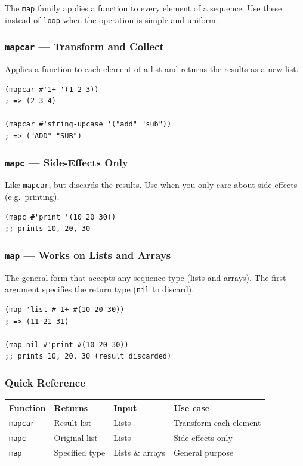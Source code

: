 The \texttt{map} family applies a function to every element of a
sequence. Use these instead of \texttt{loop} when the operation is
simple and uniform.

\subsubsection{\texttt{mapcar} --- Transform and Collect}

Applies a function to each element of a list and returns the results
as a new list.

\begin{lstlisting}
(mapcar #'1+ '(1 2 3))
; => (2 3 4)

(mapcar #'string-upcase '("add" "sub"))
; => ("ADD" "SUB")
\end{lstlisting}

\subsubsection{\texttt{mapc} --- Side-Effects Only}

Like \texttt{mapcar}, but discards the results. Use when you only
care about side-effects (e.g.\ printing).

\begin{lstlisting}
(mapc #'print '(10 20 30))
;; prints 10, 20, 30
\end{lstlisting}

\subsubsection{\texttt{map} --- Works on Lists and Arrays}

The general form that accepts any sequence type (lists and arrays).
The first argument specifies the return type (\texttt{nil} to discard).

\begin{lstlisting}
(map 'list #'1+ #(10 20 30))
; => (11 21 31)

(map nil #'print #(10 20 30))
;; prints 10, 20, 30 (result discarded)
\end{lstlisting}

\subsubsection{Quick Reference}

\begin{center}
\begin{tabular}{lllp{4cm}}
  \toprule
  \textbf{Function} & \textbf{Returns} & \textbf{Input} & \textbf{Use case} \\
  \midrule
  \texttt{mapcar} & Result list           & Lists  & Transform each element \\
  \texttt{mapc}   & Original list         & Lists  & Side-effects only \\
  \texttt{map}    & Specified type        & Lists \& arrays & General purpose \\
  \bottomrule
\end{tabular}
\end{center}

